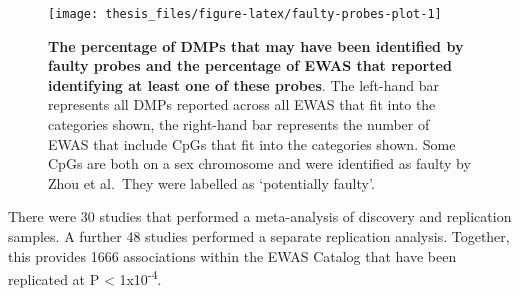\documentclass[11pt,twoside]{bristolthesis}
\begin{document}
\begin{figure}[!h]

{\centering \texttt{[image: thesis\_files/figure-latex/faulty-probes-plot-1]} 

}

\caption[The percentage of DMPs that may have been identified by faulty probes and the percentage of EWAS that reported identifying at least one of these probes]{\textbf{The percentage of DMPs that may have been identified by faulty probes and the percentage of EWAS that reported identifying at least one of these probes}. The left-hand bar represents all DMPs reported across all EWAS that fit into the categories shown, the right-hand bar represents the number of EWAS that include CpGs that fit into the categories shown. Some CpGs are both on a sex chromosome and were identified as faulty by Zhou et al.~They were labelled as `potentially faulty'.}\label{fig:faulty-probes-plot}
\end{figure}
There were 30 studies that performed a meta-analysis of discovery and replication samples. A further 48 studies performed a separate replication analysis. Together, this provides 1666 associations within the EWAS Catalog that have been replicated at P \textless{} 1x10\textsuperscript{-4}.
\end{document}
